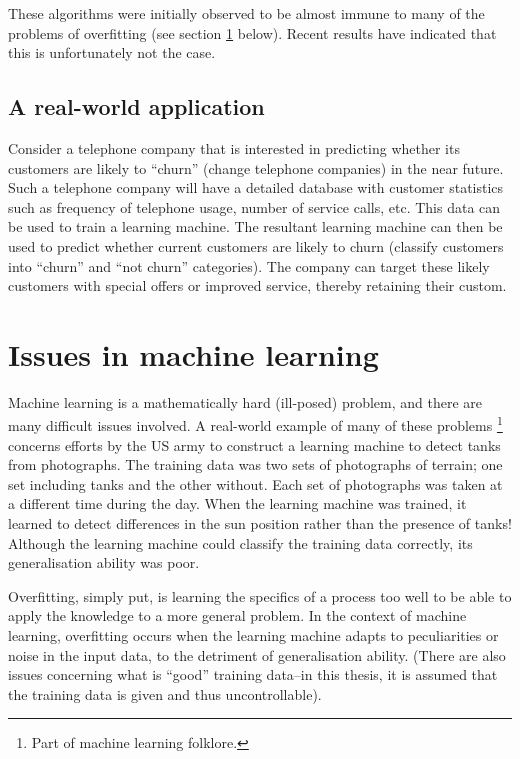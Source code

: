 These algorithms were initially observed to be almost immune to many
of the problems of overfitting (see section \ref{sec:issues} below).
Recent results have indicated that this is unfortunately not the
case.

\subsection{A real-world application}
\label{sec:churn example}

Consider a telephone company that is interested in predicting whether
its customers are likely to ``churn'' (change telephone companies) in
the near future.  Such a telephone company will have a detailed
database with customer statistics such as frequency of telephone
usage, number of service calls, etc.  This data can be used to train a
learning machine.   The resultant learning machine can then be used to
predict whether current customers are likely to churn (classify
customers into ``churn'' and ``not churn'' categories).  The company
can target these likely customers with special offers or improved
service, thereby retaining their custom.

\section{Issues in machine learning}
\label{sec:issues}

Machine learning is a mathematically hard (ill-posed) problem, and
there are many difficult issues involved.  A real-world example of
many of these problems%
\footnote{Part of machine learning folklore.}
concerns efforts by the US army to construct a learning machine to
detect tanks from photographs.  The training data was two sets of
photographs of terrain; one set including tanks and the other without.
Each set of  photographs was taken at a different time during the day.
When the learning machine was trained, it learned to detect
differences in the sun position rather than the presence of tanks!
Although the learning machine could classify the training data
correctly, its generalisation ability was poor.

Overfitting, simply put, is learning the specifics of a process too
well to be able to apply the knowledge to a more general problem.  In
the context of machine learning, overfitting occurs when the learning
machine adapts to peculiarities or noise in the input data, to the
detriment of generalisation ability.  (There are also issues
concerning what is ``good'' training data--in this thesis, it is
assumed that the training data is given and thus uncontrollable).


